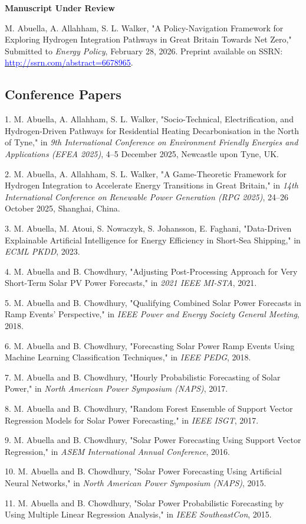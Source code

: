 \documentclass[11pt,letterpaper,sans]{moderncv}
\begin{document}
\medskip
\textbf{Manuscript Under Review}

M. Abuella, A. Allahham, S. L. Walker,
"A Policy-Navigation Framework for Exploring Hydrogen Integration Pathways in Great Britain Towards Net Zero,"
Submitted to \textit{Energy Policy}, February 28, 2026.
Preprint available on SSRN:
\href{http://ssrn.com/abstract=6678965}{\textcolor{blue}{http://ssrn.com/abstract=6678965}}.

\subsection*{Conference Papers}

1. M. Abuella, A. Allahham, S. L. Walker,
"Socio-Technical, Electrification, and Hydrogen-Driven Pathways for Residential Heating Decarbonisation in the North of Tyne,"
in \textit{9th International Conference on Environment Friendly Energies and Applications (EFEA 2025)}, 4--5 December 2025, Newcastle upon Tyne, UK.

2. M. Abuella, A. Allahham, S. L. Walker,
"A Game-Theoretic Framework for Hydrogen Integration to Accelerate Energy Transitions in Great Britain,"
in \textit{14th International Conference on Renewable Power Generation (RPG 2025)}, 24--26 October 2025, Shanghai, China.

3. M. Abuella, M. Atoui, S. Nowaczyk, S. Johansson, E. Faghani,
"Data-Driven Explainable Artificial Intelligence for Energy Efficiency in Short-Sea Shipping,"
in \textit{ECML PKDD}, 2023.

4. M. Abuella and B. Chowdhury,
"Adjusting Post-Processing Approach for Very Short-Term Solar PV Power Forecasts,"
in \textit{2021 IEEE MI-STA}, 2021.

5. M. Abuella and B. Chowdhury,
"Qualifying Combined Solar Power Forecasts in Ramp Events' Perspective,"
in \textit{IEEE Power and Energy Society General Meeting}, 2018.

6. M. Abuella and B. Chowdhury,
"Forecasting Solar Power Ramp Events Using Machine Learning Classification Techniques,"
in \textit{IEEE PEDG}, 2018.

7. M. Abuella and B. Chowdhury,
"Hourly Probabilistic Forecasting of Solar Power,"
in \textit{North American Power Symposium (NAPS)}, 2017.

8. M. Abuella and B. Chowdhury,
"Random Forest Ensemble of Support Vector Regression Models for Solar Power Forecasting,"
in \textit{IEEE ISGT}, 2017.

9. M. Abuella and B. Chowdhury,
"Solar Power Forecasting Using Support Vector Regression,"
in \textit{ASEM International Annual Conference}, 2016.

10. M. Abuella and B. Chowdhury,
"Solar Power Forecasting Using Artificial Neural Networks,"
in \textit{North American Power Symposium (NAPS)}, 2015.

11. M. Abuella and B. Chowdhury,
"Solar Power Probabilistic Forecasting by Using Multiple Linear Regression Analysis,"
in \textit{IEEE SoutheastCon}, 2015.
\end{document}
